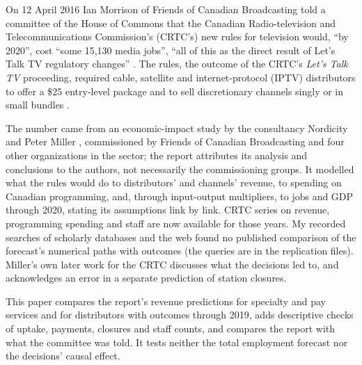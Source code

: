 
On 12 April 2016 Ian Morrison of Friends of Canadian Broadcasting told a committee of the House of Commons that the Canadian Radio-television and Telecommunications Commission's (CRTC's) new rules for television would, \enquote{by 2020}, cost \enquote{some 15,130 media jobs}, \enquote{all of this as the direct result of Let's Talk TV regulatory changes} \citep[time marks 0900--0905]{commons2016chpc8}. The rules, the outcome of the CRTC's \textit{Let's Talk TV} proceeding, required cable, satellite and internet-protocol (IPTV) distributors to offer a \$25 entry-level package and to sell discretionary channels singly or in small bundles \citep{crtc2015worldofchoice}.

The number came from an economic-impact study by the consultancy Nordicity and Peter Miller \citeyearpar{nordicity2015television}, commissioned by Friends of Canadian Broadcasting and four other organizations in the sector; the report attributes its analysis and conclusions to the authors, not necessarily the commissioning groups. It modelled what the rules would do to distributors' and channels' revenue, to spending on Canadian programming, and, through input-output multipliers, to jobs and GDP through 2020, stating its assumptions link by link. CRTC series on revenue, programming spending and staff are now available for those years. My recorded searches of scholarly databases and the web found no published comparison of the forecast's numerical paths with outcomes (the queries are in the replication files). Miller's own later work for the CRTC \citeyearpar[n.~88, n.~196]{miller2022rights} discusses what the decisions led to, and acknowledges an error in a separate prediction of station closures.

This paper compares the report's revenue predictions for specialty and pay services and for distributors with outcomes through 2019, adds descriptive checks of uptake, payments, closures and staff counts, and compares the report with what the committee was told. It tests neither the total employment forecast nor the decisions' causal effect.

